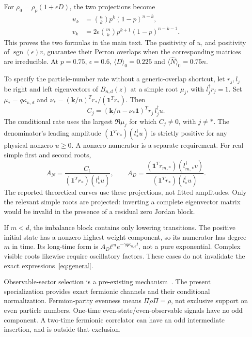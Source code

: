 \documentclass[aps,pra,reprint,superscriptaddress,nofootinbib,floatfix]{revtex4-2}
\begin{document}
For $\rho_0=\rho_p(1+\epsilon D)$, the two projections become
\begin{align}
u_k&=\binom nk p^k(1-p)^{n-k},\nonumber\\
v_k&=2\epsilon\binom mk p^{k+1}(1-p)^{n-k-1}.
\end{align}
This proves the two formulas in the main text. The positivity of $u$, and positivity of $\operatorname{sgn}(\epsilon)v$, guarantee their Perron overlaps when the corresponding matrices are irreducible. At $p=0.75$, $\epsilon=0.6$, $\langle D\rangle_0=0.225$ and $\langle\hat N\rangle_0=0.75n$.

To specify the particle-number rate without a generic-overlap shortcut, let $r_j,l_j$ be right and left eigenvectors of $B_{n,d}(z)$ at a simple root $\mu_j$, with $l_j^\dagger r_j=1$. Set $\mu_*=q\kappa_{n,d}$ and $\nu_*=(\bm k/n)^Tr_*/(\bm1^Tr_*)$. Then
\begin{equation}
C_j=(\bm k/n-\nu_*\bm1)^Tr_j\,l_j^\dagger u.
\end{equation}
The conditional rate uses the largest $\Re\mu_j$ for which $C_j\ne0$, with $j\ne *$. The denominator's leading amplitude $(\bm1^Tr_*)(l_*^\dagger u)$ is strictly positive for any physical nonzero $u\ge0$. A nonzero numerator is a separate requirement. For real simple first and second roots,
\begin{equation}
A_N=\frac{C_1}{(\bm1^Tr_*)(l_*^\dagger u)},\qquad
A_D=\frac{(\bm1^Tr_{m,*})(l_{m,*}^\dagger v)}{(\bm1^Tr_*)(l_*^\dagger u)}.
\end{equation}
The reported theoretical curves use these projections, not fitted amplitudes. Only the relevant simple roots are projected: inverting a complete eigenvector matrix would be invalid in the presence of a residual zero Jordan block.

If $m<d$, the imbalance block contains only lowering transitions. The positive initial state has a nonzero highest-weight component, so its numerator has degree $m$ in time. Its long-time form is $A_Dt^me^{-\gamma q\kappa_{n,d}t}$, not a pure exponential. Complex visible roots likewise require oscillatory factors. These cases do not invalidate the exact expressions~\eqref{eq:general}.

Observable-sector selection is a pre-existing mechanism~\cite{vanCaspel}. The present specialization provides exact fermionic channels and their conditional normalization. Fermion-parity evenness means $\Pi\rho\Pi=\rho$, not exclusive support on even particle numbers. One-time even-state/even-observable signals have no odd component. A two-time fermionic correlator can have an odd intermediate insertion, and is outside that exclusion.
\end{document}

